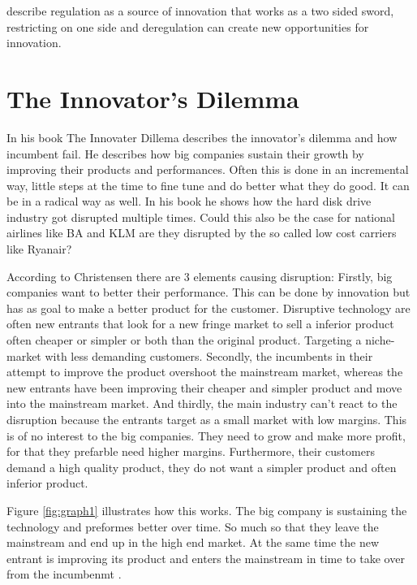 \documentclass[a4paper, 11pt]{article}
\begin{document}
\cite{TiddBessant} describe regulation as a source of innovation that works as a two sided sword, restricting on one side and deregulation can create new opportunities for innovation.

\label{sec:this-is-a-section}

\section{The Innovator's Dilemma}


In his book The Innovater Dillema \cite{Christensen97} describes the innovator's dilemma and how incumbent fail. He describes how big companies sustain their growth by improving their products and performances. Often this is done in an incremental way, little steps at the time to fine tune and do better what they do good. It can be in a radical way as well. In his book he shows how the hard disk drive industry got disrupted multiple times. Could this also be the case for national airlines like BA and KLM are they disrupted by the so called low cost carriers like Ryanair?

According to Christensen \cite{Christensen97} there are 3 elements causing disruption:
Firstly, big companies want to better their performance. This can be done by innovation but has as goal to make a better product for the customer. Disruptive technology are often new entrants that look for a new fringe market to sell a inferior product often cheaper or simpler or both than the original product. Targeting a niche-market with less demanding customers. Secondly, the incumbents in their attempt to improve the product overshoot the mainstream market, whereas the new entrants have been improving their cheaper and simpler product and move into the mainstream market.
And thirdly, the main industry can't react to the disruption because the entrants target as a small market with low margins. This is of no interest to the big companies. They need to grow and make more profit, for that they prefarble need higher margins. Furthermore, their customers demand a high quality product, they do not want a simpler product and often inferior product.

Figure \ref{fig:graph1} illustrates how this works. The big company is sustaining the technology and preformes better over time. So much so that they leave the mainstream and end up in the high end market. At the same time the new entrant is improving its product and enters the mainstream in time to take over from the incumbenmt \cite{Christensen97}.
\end{document}
